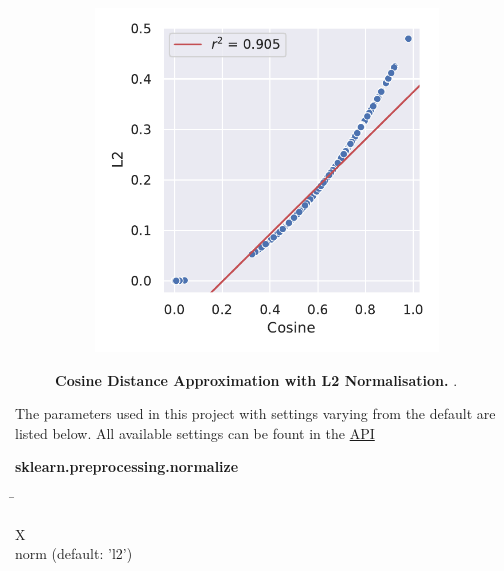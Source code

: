 \begin{figure}
\begin{adjustbox}{minipage=\dimexpr{}\fboxrule,fbox}
\begin{subfigure}[b]{0.475\textwidth}
            \label{subfig:Normalisation_UMAP}            \includegraphics[width=\textwidth]{UMAP/Difference_Distance_Calculation.pdf}
        \end{subfigure}
    \end{adjustbox}
    \caption[Cosine Distance Approximation with L2 Normalisation]{\textbf{Cosine Distance Approximation with L2 Normalisation.} .}
    \label{fig:Normalisation_Methods}
\end{figure}

The parameters used in this project with settings varying from the default are listed below. All available settings can be fount in the \href{https://scikit-learn.org/stable/modules/generated/sklearn.preprocessing.normalize.html}{API}

\begin{leftbar}
    \textbf{sklearn.preprocessing.normalize}
    \begin{nstabbing}
        \qquad\qquad\qquad\qquad\qquad\quad\=\kill
        
        X \> \\
        
        norm \> (default: ’l2’)
        
    \end{nstabbing}
\end{leftbar}
